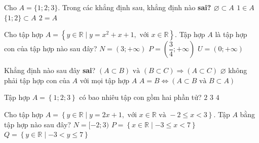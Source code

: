 \begin{ex}%
	Cho $A=\{1;2;3\}$. Trong các khẳng định sau, khẳng định nào  \bf{sai}?
	 \choice
		 {$\varnothing \subset A$}
		{$1  \in A$}
		{$\{1;2\} \subset  A$}
		{\True $2=A$} 
\end{ex}

\begin{ex}%
	Cho tập hợp $A = \left\{y \in  \mathbb{R} \mid y = x^2+x+1, \text{ với } x \in \mathbb{R}\right\}$. Tập hợp $A$ là tập hợp con của tập hợp nào sau đây?
	\choice{$M =  \left(-\infty;\dfrac{3}{4}\right] $}
		{$N = (3;+\infty)  $}
		{$P = \left(\dfrac{3}{4};+\infty\right)  $}
		{\True $U  = (0;+\infty) $}
\end{ex}

\begin{ex}%
	Khẳng định nào  sau đây {\bf sai}?
		{$(A \subset B) \text{  và } (B \subset C) \Rightarrow (A \subset C)$}
		{\True $\varnothing  $ không phải tập hợp con của $A$ với mọi tập hợp $A$}
		{$A=B \Leftrightarrow (A\subset B \text{ và } B  \subset A) $}
\end{ex}

\begin{ex}%
	Tập hợp $A = \left\{1;2;3\right\}$ có bao nhiêu tập  con gồm hai phần tử?
		{$2$} 
		 {\True $3$}
		{$4$} 
\end{ex}

\begin{ex}%
	Cho tập hợp $A = \left\{y \in \mathbb{R} \mid y = 2x+1, \text{ với } x \in \mathbb{R} \text{ và } -2 \le  x < 3\right\}$. Tập $A$ bằng tập hợp nào sau đây?
		{ $N = [-2;3)$} 
		{\True $P =  \left\{x \in \mathbb{R} \mid -3 \le x < 7\right\}$}
		{$Q = \left\{y \in \mathbb{R} \mid -3 <  y \le 7 \right\}$}
\end{ex}

